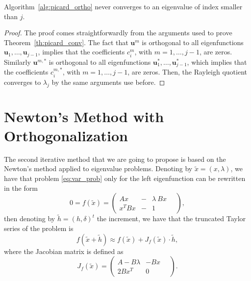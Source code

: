 \documentclass[smallextended]{svjour3}
\begin{document}
\begin{theorem}
Algorithm~\ref{alg:picard_ortho} never converges to an eigenvalue of index smaller than $j$.
\end{theorem}

\begin{proof}
The proof comes straightforwardly from the arguments used to prove Theorem~\ref{th:picard_conv}.
The fact that $\mathbf{u}^m$ is orthogonal to all eigenfunctions $\mathbf{u}_1,\dots,\mathbf{u}_{j-1}$, implies that the coefficients $c_i^m$, with $m=1,\dots,j-1$, are zeros. Similarly $\mathbf{u}^{m,*}$ is orthogonal to all eigenfunctions $\mathbf{u}_1^*,\dots,\mathbf{u}_{j-1}^*$, which implies that the coefficients $c_i^{m,*}$, with $m=1,\dots,j-1$, are zeros.
Then, the Rayleigh quotient converges to $\lambda_j$ by the same arguments use before.
\end{proof}




\section{Newton's Method with Orthogonalization}\label{sec:newton}


The second iterative method that we are going to propose is based on the Newton's method applied to eigenvalue problems. Denoting by $\tilde x=(x,\lambda)$, we have that problem \eqref{eq:var_prob} only for the left eigenfunction can be rewritten in the form
$$
0=f(\tilde x)=
\left(
\begin{array}{lcl}
A x&-& \lambda\ Bx
\\
  x^T Bx&-& 1
\end{array}\quad
\right) ,
$$
then denoting by $\tilde h=(h, \delta)^t$ the increment, we have that the truncated Taylor series of the problem is
\begin{equation}\label{eq:newton}
f(\tilde x + \tilde h)\approx f(\tilde x) + J_f(\tilde x)\cdot \tilde h, 
\end{equation}
where the Jacobian matrix is defined as
$$
J_f(\tilde x)=
\left(
\begin{array}{lr}
A - B\lambda & -Bx
\\
  2Bx^T  & 0
\end{array}\quad
\right) .
$$
\end{document}
